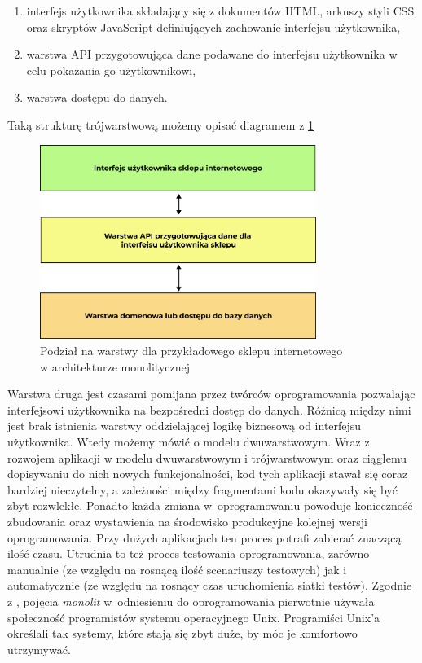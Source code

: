 \documentclass{SGGW-thesis}
\begin{document}
{\begin{enumerate}
	\item interfejs użytkownika składający się z dokumentów HTML, arkuszy styli CSS oraz skryptów JavaScript definiujących zachowanie interfejsu użytkownika,
	\item warstwa API przygotowująca dane podawane do interfejsu użytkownika w celu pokazania go użytkownikowi,
	\item warstwa dostępu do danych.
\end{enumerate}

Taką strukturę trójwarstwową możemy opisać diagramem z \cref{fig:monolith_diagram}

\begin{figure}[h]
	\centering
	\captionsetup{justification=centering}
	\includegraphics[width=0.8\textwidth]{monolith_diagram.png}
	\caption{Podział na warstwy dla przykładowego sklepu internetowego \\ w architekturze monolitycznej}
	\label{fig:monolith_diagram}
\end{figure}

Warstwa druga jest czasami pomijana przez twórców oprogramowania pozwalając interfejsowi użytkownika na bezpośredni dostęp do danych. Różnicą między nimi jest brak istnienia warstwy oddzielającej logikę biznesową od interfejsu użytkownika. Wtedy możemy mówić o modelu dwuwarstwowym.
Wraz z rozwojem aplikacji w modelu dwuwarstwowym i trójwarstwowym oraz ciągłemu dopisywaniu do nich nowych funkcjonalności, kod tych aplikacji stawał się coraz bardziej nieczytelny, a zależności między fragmentami kodu okazywały się być zbyt rozwlekłe.
Ponadto każda zmiana w~oprogramowaniu powoduje konieczność zbudowania oraz wystawienia na środowisko produkcyjne kolejnej wersji oprogramowania. Przy dużych aplikacjach ten proces potrafi zabierać znaczącą ilość czasu. Utrudnia to też proces testowania oprogramowania, zarówno manualnie (ze względu na rosnącą ilość scenariuszy testowych) jak i automatycznie (ze względu na rosnący czas uruchomienia siatki testów).
Zgodnie z \cite{fowler}, pojęcia \textit{monolit} w~odniesieniu do oprogramowania pierwotnie używała społeczność programistów systemu operacyjnego Unix. Programiści Unix'a określali tak systemy, które stają się zbyt duże, by móc je komfortowo utrzymywać.

}
\end{document}
